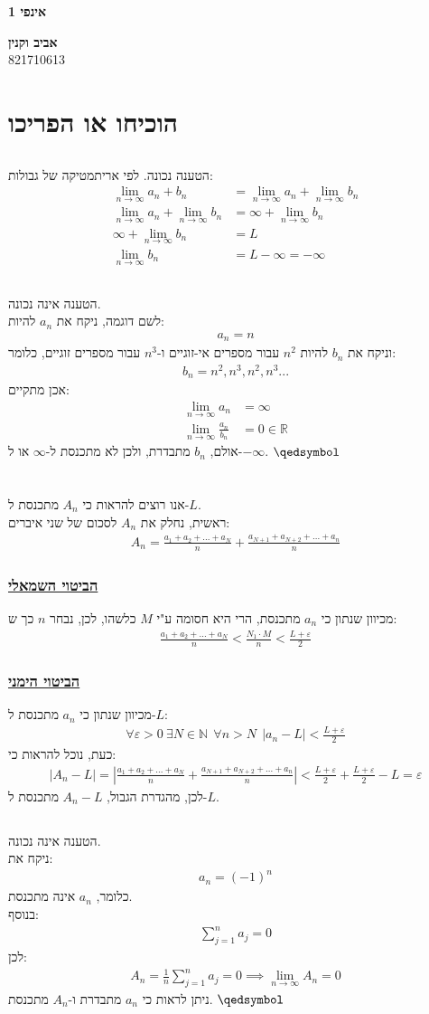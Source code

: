 \documentclass[a4paper, 12pt, leqno]{article}
\newcommand{\sub}[1]{\subsection{\underline{#1}}}
\newcommand{\subsub}[1]{\subsubsection{\underline{#1}}}
\newcommand{\RR}{\mathbb{R}}
\newcommand{\N}{\ensuremath{\mathbb{N}}}
\newcommand{\eq}[1]{\begin{align*}#1\end{align*}}
\renewcommand{\qed}{\hfill\(\qedsymbol\)}
\newcommand{\limn}{\lim_{n\to\infty}}
\begin{document}
\begin{titlepage}
    \begin{center}
        \vspace*{4cm}
    
        {\fontsize{35pt}{35pt}\selectfont \textbf{אינפי 1}}
        
        \vspace{0.4cm}
        
        {}
    
        \vfill
            
        {\Large\textbf{אביב וקנין}\\821710613}
    \end{center}
\end{titlepage}

\section{הוכיחו או הפריכו}
\sub{}
הטענה נכונה.
לפי אריתמטיקה של גבולות:
\eq{
    \limn{a_n+b_n}&=\limn{a_n}+\limn{b_n}\\
    \limn{a_n}+\limn{b_n}&=\infty+\limn{b_n}\\
    \infty+\limn{b_n}&=L\\
    \limn{b_n}&=L-\infty=-\infty
}
\sub{}
הטענה אינה נכונה.\\
לשם דוגמה, ניקח את $a_n$ להיות:
\eq{
    a_n=n
}
וניקח את $b_n$ להיות $n^2$ עבור מספרים אי-זוגיים ו-$n^3$ עבור מספרים זוגיים, כלומר:
\eq{
    b_n=n^2,n^3,n^2,n^3...
}
אכן מתקיים:
\eq{
    \limn{a_n}&=\infty\\
    \limn\frac{a_n}{b_n}&=0\in\RR
}
אולם, $b_n$ מתבדרת, ולכן לא מתכנסת ל-$\infty$ או ל-$-\infty$.
\qed

\pagebreak
\section{}
\sub{}
אנו רוצים להראות כי $A_n$ מתכנסת ל-$L$.\\
ראשית, נחלק את $A_n$ לסכום של שני איברים:
\eq{
    A_n=\frac{a_1+a_2+...+a_N}{n}+\frac{a_{N+1}+a_{N+2}+...+a_n}{n}
}
\subsub{הביטוי השמאלי}
מכיוון שנתון כי $a_n$ מתכנסת, הרי היא חסומה ע"י $M$ כלשהו, לכן, נבחר $n$ כך ש:
\eq{
    \frac{a_1+a_2+...+a_N}{n}<\frac{N_1\cdot{M}}{n}<\frac{L+\varepsilon}{2}
}
\subsub{הביטוי הימני}
מכיוון שנתון כי $a_n$ מתכנסת ל-$L$:
\eq{
    \forall\varepsilon>0~\exists{N}\in\N~~\forall{n}>N~~|a_n-L|<\frac{L+\varepsilon}{2}
}
כעת, נוכל להראות כי:
\eq{
    |A_n-L|=|\frac{a_1+a_2+...+a_N}{n}+\frac{a_{N+1}+a_{N+2}+...+a_n}{n}|<\frac{L+\varepsilon}{2}+\frac{L+\varepsilon}{2}-L=\varepsilon
}
לכן, מהגדרת הגבול, $A_n-L$ מתכנסת ל-$L$.
\sub{}
הטענה אינה נכונה.\\
ניקח את:
\eq{
    a_n=(-1)^n
}
כלומר, $a_n$ אינה מתכנסת.\\
בנוסף:
\eq{
    \sum^n_{j=1}a_j=0
}
לכן:
\eq{
    A_n=\frac{1}{n}\sum^n_{j=1}a_j=0\implies\limn{A_n}=0
}
ניתן לראות כי $a_n$ מתבדרת ו-$A_n$ מתכנסת.
\qed
\end{document}
